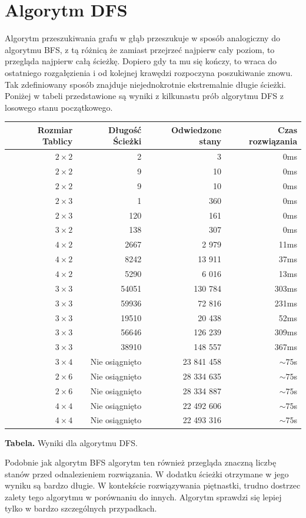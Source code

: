 \documentclass{classrep}
\begin{document}
\section{Algorytm DFS}
Algorytm przeszukiwania grafu w głąb przeszukuje w sposób analogiczny do algorytmu BFS, z tą różnicą że zamiast przejrzeć najpierw cały poziom, to przegląda najpierw całą ścieżkę. Dopiero gdy ta mu się kończy, to wraca do ostatniego rozgałęzienia i od kolejnej krawędzi rozpoczyna poszukiwanie znowu.
Tak zdefiniowany sposób znajduje niejednokrotnie ekstremalnie długie ścieżki. Poniżej w tabeli przedstawione są wyniki z kilkunastu prób algorytmu DFS z losowego stanu początkowego.
\begin{center}
\begin{longtable}{|r|r|r|r|}
  \hline 
  Rozmiar Tablicy & Długość Ścieżki & Odwiedzone stany & Czas rozwiązania \\
	\hline
		$2 \times 2$ & 2 & 3 & 0ms \\
	\hline
		$2 \times 2$ & 9 & 10 & 0ms \\
	\hline
		$2 \times 2$ & 9 & 10 & 0ms \\
	\hline
		$2 \times 3$ & 1 & 360 & 0ms \\
	\hline
		$2 \times 3$ & 120 & 161 & 0ms \\
	\hline
		$3 \times 2$ & 138 & 307 & 0ms \\
	\hline
		$4 \times 2$ & 2667 & 2 979 & 11ms \\
	\hline
		$4 \times 2$ & 8242 & 13 911 & 37ms \\
	\hline
		$4 \times 2$ & 5290 & 6 016 & 13ms \\
	\hline
		$3 \times 3$ & 54051 & 130 784 & 303ms \\
	\hline
		$3 \times 3$ & 59936 & 72 816 & 231ms \\
	\hline
		$3 \times 3$ & 19510 & 20 438 & 52ms \\
	\hline
		$3 \times 3$ & 56646 & 126 239 & 309ms \\
	\hline
		$3 \times 3$ & 38910 & 148 557 & 367ms \\
	\hline
		$3 \times 4$ & Nie osiągnięto & 23 841 458 & $\sim 75$s \\
	\hline
		$2 \times 6$ & Nie osiągnięto & 28 334 635 & $\sim 75$s \\
	\hline
		$2 \times 6$ & Nie osiągnięto & 28 334 887 & $\sim 75$s \\
	\hline
		$4 \times 4$ & Nie osiągnięto & 22 492 606 & $\sim 75$s \\
	\hline
		$4 \times 4$ & Nie osiągnięto & 22 493 316 & $\sim 75$s \\
	\hline
\end{longtable} 
\textbf{Tabela.} Wyniki dla algorytmu DFS.
\end{center}
Podobnie jak algorytm BFS algorytm ten również przegląda znaczną liczbę stanów przed odnalezieniem rozwiązania. W dodatku ścieżki otrzymane w jego wyniku są bardzo długie. W kontekście rozwiązywania piętnastki, trudno dostrzec zalety tego algorytmu w porównaniu do innych. Algorytm sprawdzi się lepiej tylko w bardzo szczególnych przypadkach.
\end{document}
